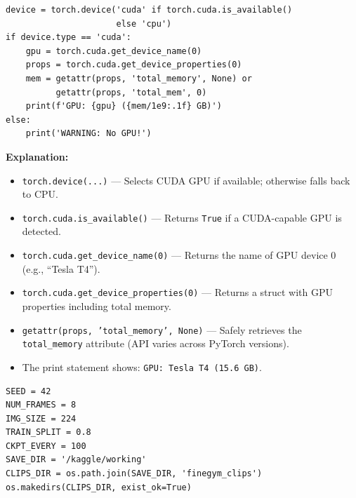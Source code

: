 \documentclass[a4paper, 12pt]{article}
\newenvironment{explanation}{%
  \par\smallskip
  \noindent\textcolor{blue!70!black}{\textbf{Explanation:}}\\
  \noindent
}{\par\medskip}
\begin{document}
\begin{lstlisting}
device = torch.device('cuda' if torch.cuda.is_available()
                      else 'cpu')
if device.type == 'cuda':
    gpu = torch.cuda.get_device_name(0)
    props = torch.cuda.get_device_properties(0)
    mem = getattr(props, 'total_memory', None) or
          getattr(props, 'total_mem', 0)
    print(f'GPU: {gpu} ({mem/1e9:.1f} GB)')
else:
    print('WARNING: No GPU!')
\end{lstlisting}

\begin{explanation}
\begin{itemize}[nosep]
  \item \texttt{torch.device(...)} --- Selects CUDA GPU if available; otherwise falls back to CPU.
  \item \texttt{torch.cuda.is\_available()} --- Returns \texttt{True} if a CUDA-capable GPU is detected.
  \item \texttt{torch.cuda.get\_device\_name(0)} --- Returns the name of GPU device 0 (e.g., ``Tesla T4'').
  \item \texttt{torch.cuda.get\_device\_properties(0)} --- Returns a struct with GPU properties including total memory.
  \item \texttt{getattr(props, 'total\_memory', None)} --- Safely retrieves the \texttt{total\_memory} attribute (API varies across PyTorch versions).
  \item The print statement shows: \texttt{GPU: Tesla T4 (15.6 GB)}.
\end{itemize}
\end{explanation}

\begin{lstlisting}
SEED = 42
NUM_FRAMES = 8
IMG_SIZE = 224
TRAIN_SPLIT = 0.8
CKPT_EVERY = 100
SAVE_DIR = '/kaggle/working'
CLIPS_DIR = os.path.join(SAVE_DIR, 'finegym_clips')
os.makedirs(CLIPS_DIR, exist_ok=True)
\end{lstlisting}
\end{document}
